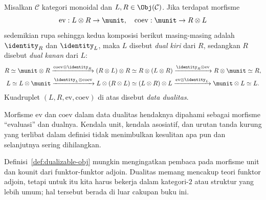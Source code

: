 \begin{definition}\label{def:dualizable-obj}
	Misalkan $\mathcal{C}$ kategori monoidal dan
	$L,R\in\Obj(\mathcal{C})$. Jika terdapat morfisme
	\[ \mathrm{ev}: L \otimes R \to \munit, \quad \mathrm{coev}: \munit \to R \otimes L \]
	sedemikian rupa sehingga kedua komposisi berikut masing-masing adalah
	$\identity_R$ dan $\identity_L$, maka $L$ disebut \emph{dual kiri} dari
	$R$, sedangkan $R$ disebut \emph{dual kanan} dari $L$:
	\begin{gather*}
		R \simeq \munit \otimes R \xrightarrow{\mathrm{coev} \otimes \identity_R} (R \otimes L) \otimes R \simeq  R \otimes (L \otimes R) \xrightarrow{\identity_R \otimes \mathrm{ev}} R \otimes \munit \simeq R, \\
		L \simeq L \otimes \munit \xrightarrow{\identity_L \otimes \mathrm{coev}} L \otimes (R \otimes L) \simeq (L \otimes R) \otimes L \xrightarrow{\mathrm{ev} \otimes \identity_L} \munit \otimes L \simeq L.
	\end{gather*}
	Kuadruplet $(L,R,\mathrm{ev},\mathrm{coev})$ di atas disebut
	\emph{data dualitas}.
\end{definition}

Morfisme $\mathrm{ev}$ dan $\mathrm{coev}$ dalam data dualitas hendaknya
dipahami sebagai morfisme ``evaluasi'' dan dualnya. Kendala unit, kendala
asosiatif, dan urutan tanda kurung yang terlibat dalam definisi tidak
menimbulkan kesulitan apa pun dan selanjutnya sering dihilangkan.

Definisi~\ref{def:dualizable-obj} mungkin mengingatkan pembaca pada morfisme
unit dan kounit dari funktor-funktor adjoin. Dualitas memang mencakup teori
funktor adjoin, tetapi untuk itu kita harus bekerja dalam kategori-$2$ atau
struktur yang lebih umum; hal tersebut berada di luar cakupan buku ini.

